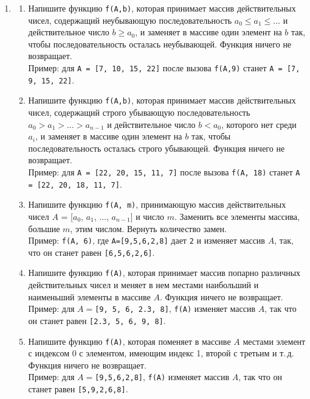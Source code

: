 \documentclass{article}
\begin{document}
\begin{enumerate}[label={}, leftmargin=0pt, itemindent=0pt]
\hrulefill

\item
\begin{enumerate}[label=\arabic{enumi}.\arabic*.]
\item 
Напишите функцию \texttt{f(A,b)}, которая принимает массив действительных чисел, содержащий неубывающую последовательность $a_0 \leqslant a_1 \leqslant \ldots$ и действительное число $b\geqslant a_0$, и заменяет в массиве один элемент на $b$ так, чтобы последовательность осталась неубывающей. Функция ничего не возвращает.
\\Пример: для \texttt{A = [7, 10, 15, 22]} после вызова \texttt{f(A,9)} станет \texttt{A = [7, 9, 15, 22]}.

\item 
Напишите функцию \texttt{f(A,b)}, которая принимает массив действительных чисел, содержащий строго убывающую последовательность $a_0 > a_1 > \ldots > a_{n-1}$ и действительное число $b<a_0$, которого нет среди $a_i$, и заменяет в массиве один элемент на $b$ так, чтобы последовательность осталась строго убывающей. Функция ничего не возвращает.
\\Пример: для \texttt{A = [22, 20, 15, 11, 7]} после вызова \texttt{f(A, 18)} станет \texttt{A = [22, 20, 18, 11, 7]}.

\item 
Напишите функцию \texttt{f(A,\,m)}, принимающую массив действительных чисел $A$ = [$a_0$, $a_1$, $\ldots$, $a_{n-1}$] и число $m$. Заменить все элементы массива, большие $m$, этим числом. Вернуть количество замен.
\\Пример: \texttt{f(A, 6)}, где \texttt{A=[9,5,6,2,8]} дает \texttt{2} и изменяет массив $A$, так, что он станет равен \texttt{[6,5,6,2,6]}.

\item 
Напишите функцию \texttt{f(A)}, которая принимает массив попарно различных действительных чисел и меняет в нем местами наибольший и наименьший элементы в массиве $A$. Функция ничего не возвращает.
\\Пример: для $A=$\texttt{[9, 5, 6, 2.3, 8]}, \texttt{f(A)} изменяет массив $A$, так что он станет равен \texttt{[2.3, 5, 6, 9, 8]}.



\item 
Напишите функцию \texttt{f(A)}, которая поменяет в массиве $A$ местами элемент с индексом 0 с элементом, имеющим индекс 1, второй с третьим и т.\,д. Функция ничего не возвращает.
\\Пример: для $A=$\texttt{[9,5,6,2,8]}, \texttt{f(A)} изменяет массив $A$, так что он станет равен \texttt{[5,9,2,6,8]}.


\end{enumerate}
\end{enumerate}
\end{document}
